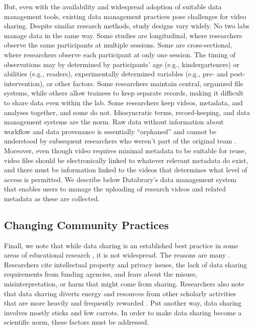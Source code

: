 \documentclass[letterpaper,man,apacite]{apa6}
\begin{document}
But, even with the availability and widespread adoption of suitable data management tools, existing data management practices pose challenges for video sharing.
Despite similar research methods, study designs vary widely. 
No two labs manage data in the same way. 
Some studies are longitudinal, where researchers observe the same participants at multiple sessions. 
Some are cross-sectional, where researchers observe each participant at only one session. 
The timing of observations may by determined by participants’ age (e.g., kindergarteners) or abilities (e.g., readers), experimentally determined variables (e.g., pre- and post-intervention), or other factors. 
Some researchers maintain central, organized file systems, while others allow trainees to keep separate records, making it difficult to share data even within the lab. 
Some researchers keep videos, metadata, and analyses together, and some do not. 
Idiosyncratic terms, record-keeping, and data management systems are the norm. 
Raw data without information about workflow and data provenance is essentially “orphaned” and cannot be understood by subsequent researchers who weren’t part of the original team \cite{curry2011}. 
Moreover, even though video requires minimal metadata to be suitable for reuse, video files should be electronically linked to whatever relevant metadata do exist, and there must be information linked to the videos that determines what level of access is permitted. 
We describe below Databrary's data management system that enables users to manage the uploading of research videos and related metadata as these are collected.

\subsection{Changing Community Practices}

Finall, we note that while data sharing is an established best practice in some areas of educational research \cite{AERA-Code-2011}, it is not widespread.
The reasons are many \cite{Ascoli2006b,Ferguson2014}.
Researchers cite intellectual property and privacy issues, the lack of data sharing requirements from funding agencies, and fears about the misuse, misinterpretation, or harm that might come from sharing.
Researchers also note that data shaving diverts energy and resources from other scholarly activities that are more heavily and frequently rewarded \cite{Ascoli2006b,Ferguson2014}.
Put another way, data sharing involves mostly sticks and few carrots.
In order to make data sharing become a scientific norm, these factors must be addressed.
\end{document}
